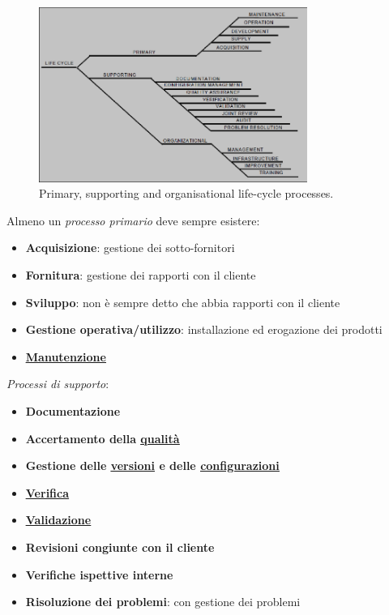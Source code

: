 			\begin{figure}[H]
				\centering
				\includegraphics[width=0.78\textwidth]{img/iso}
				\caption{Primary, supporting and organisational life-cycle processes.}
			\end{figure}

			Almeno un \textit{processo primario} deve sempre esistere:
				\begin{itemize}
					\item \textbf{Acquisizione}: gestione dei sotto-fornitori
					\item \textbf{Fornitura}: gestione dei rapporti con il cliente
					\item \textbf{Sviluppo}: non è sempre detto che abbia rapporti con il cliente
					\item \textbf{Gestione operativa/utilizzo}: installazione ed erogazione dei prodotti
					\item \textbf{\underline{\hyperref[manutenzione]{Manutenzione}}}
				\end{itemize}

			\textit{Processi di supporto}:
				\begin{itemize}
					\item \textbf{Documentazione}
					\item \textbf{Accertamento della \underline{\hyperref[qualita]{qualità}}}
					\item \textbf{Gestione delle \underline{\hyperref[versione]{versioni}} e delle \underline{\hyperref[configurazione]{configurazioni}}}
					\item \textbf{\underline{\hyperref[verificare]{Verifica}}}
					\item \textbf{\underline{\hyperref[validare]{Validazione}}}
					\item \textbf{Revisioni congiunte con il cliente}
					\item \textbf{Verifiche ispettive interne}
					\item \textbf{Risoluzione dei problemi}: con gestione dei problemi
				\end{itemize}

